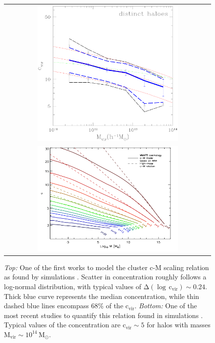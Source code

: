 \begin{figure}
 \centering
 \begin{tabular}{c}
 \includegraphics[width=0.7\textwidth]{images/Introduction/Bullock_CM_Relation.eps} \\ \includegraphics[width=0.7\textwidth]{images/Introduction/Correa_CM_Relation.png}
 \end{tabular}
 \caption[c-M Relations: Then and Now]{{\em Top: } One of the first works to model the cluster c-M scaling relation as found by simulations  \citep{BullockEtAl2001}. Scatter in concentration roughly follows a log-normal distribution, with typical values of $\mathrm{\Delta (\log \, c_{vir})\sim0.24}$. Thick blue curve represents the median concentration, while thin dashed blue lines encompass 68\% of the $\mathrm{c_{vir}}$.  {\em Bottom:} One of the most recent studies to quantify this relation found in simulations \citep{CO15.2}. Typical values of the concentration are $\mathrm{c_{vir} \sim 5}$ for halos with masses $\mathrm{M_{vir}\sim10^{14}\,M_{\odot}}$. }
\label{foot}
\end{figure}


